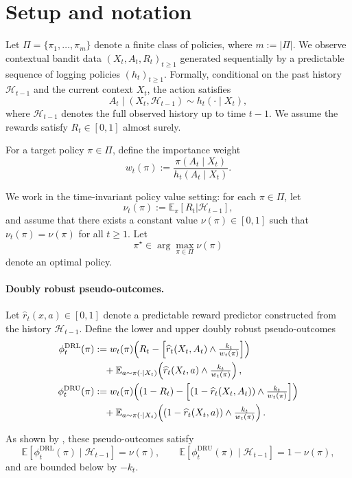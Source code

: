 \documentclass[11pt]{article}
\newcommand{\EE}{\mathbb{E}}
\newcommand{\DRL}{\mathrm{DRL}}
\newcommand{\DRU}{\mathrm{DRU}}
\begin{document}
\section{Setup and notation}

Let $\Pi=\{\pi_1,\dots,\pi_m\}$ denote a finite class of policies, where $m:=|\Pi|$. 
We observe contextual bandit data $(X_t,A_t,R_t)_{t\ge1}$ generated sequentially by a predictable sequence of logging policies $(h_t)_{t\ge1}$. 
Formally, conditional on the past history $\mathcal H_{t-1}$ and the current context $X_t$, the action satisfies
\[
A_t \mid (X_t,\mathcal H_{t-1}) \sim h_t(\cdot \mid X_t),
\]
where $\mathcal H_{t-1}$ denotes the full observed history up to time $t-1$. 
We assume the rewards satisfy $R_t\in[0,1]$ almost surely.

\noindent For a target policy $\pi\in\Pi$, define the importance weight
\[
w_t(\pi):=\frac{\pi(A_t\mid X_t)}{h_t(A_t\mid X_t)}.
\]

\noindent We work in the time-invariant policy value setting: for each $\pi\in\Pi$, let
\[
\nu_t(\pi):=\mathbb{E}_\pi[R_t | \mathcal H_{t-1}],
\]
and assume that there exists a constant value $\nu(\pi)\in[0,1]$ such that $\nu_t(\pi)=\nu(\pi)$ for all $t\ge1$.
Let
\[
\pi^\star \in \arg\max_{\pi\in\Pi} \nu(\pi)
\]
denote an optimal policy.

\paragraph{Doubly robust pseudo-outcomes.}
Let $\widehat r_t(x,a)\in[0,1]$ denote a predictable reward predictor constructed from the history $\mathcal H_{t-1}$. Define the lower and upper doubly robust pseudo-outcomes
\begin{align}
\phi_t^{\mathrm{DRL}}(\pi)
&:= w_t(\pi)\!\left(R_t-\Big[\widehat r_t(X_t,A_t)\wedge \tfrac{k_t}{w_t(\pi)}\Big]\right) \notag\\
&\quad + \mathbb{E}_{a\sim\pi(\cdot\mid X_t)}
\!\left(\widehat r_t(X_t,a)\wedge \tfrac{k_t}{w_t(\pi)}\right), \\
\phi_t^{\mathrm{DRU}}(\pi)
&:= w_t(\pi)\!\left((1-R_t)-\Big[(1-\widehat r_t(X_t,A_t))\wedge \tfrac{k_t}{w_t(\pi)}\Big]\right) \notag\\
&\quad + \mathbb{E}_{a\sim\pi(\cdot\mid X_t)}
\!\left((1-\widehat r_t(X_t,a))\wedge \tfrac{k_t}{w_t(\pi)}\right).
\end{align}

\noindent As shown by \citet{waudby-smith_anytime-valid_2024}, these pseudo-outcomes satisfy
\[
\EE\!\left[\phi_t^{\DRL}(\pi)\mid \mathcal H_{t-1}\right]=\nu(\pi),\qquad
\EE\!\left[\phi_t^{\DRU}(\pi)\mid \mathcal H_{t-1}\right]=1-\nu(\pi),
\]
and are bounded below by $-k_t$.
\end{document}
